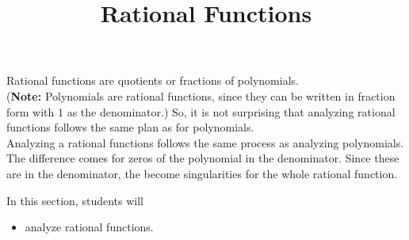 \documentclass{ximera}
\title{Rational Functions}
\begin{document}
\begin{abstract}
\end{abstract}
\maketitle












Rational functions are quotients or fractions of polynomials.  \\


(\textbf{Note:} Polynomials are rational functions, since they can be written in fraction form with $1$ as the denominator.)  So, it is not surprising that analyzing rational functions follows the same plan as for polynomials. \\


Analyzing a rational functions follows the same process as analyzing polynomials.  The difference comes for zeros of the polynomial in the denominator.  Since these are in the denominator, the become singularities for the whole rational function.


























\begin{sectionOutcomes}
In this section, students will 

\begin{itemize}
\item analyze rational functions.
\end{itemize}
\end{sectionOutcomes}
\end{document}

